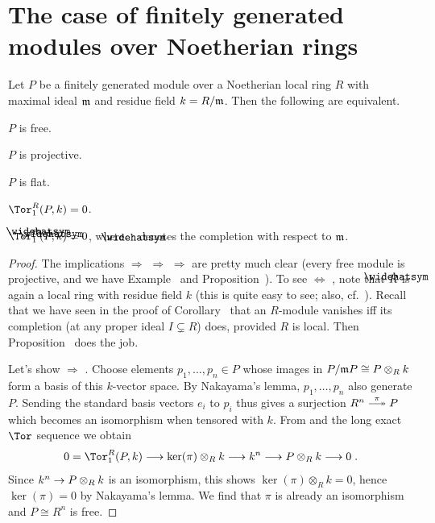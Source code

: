 \documentclass[a4paper,parskip=half,numbers=enddot, DIV=12]{scrreprt}
\begin{document}
\section{The case of finitely generated modules over Noetherian rings}
\begin{prop}
	Let $P$ be a finitely generated module over a Noetherian local ring $R$ with maximal ideal $\mathfrak{m}$ and residue field $k=R/\mathfrak{m}$. Then the following are equivalent.
	\begin{alphanumerate}
		\item $P$ is free.
		\item $P$ is projective.
		\item $P$ is flat.
		\item $\Tor_1^R(P,k)=0$.
		\item $\Tor_1^{\roof{R}}(\roof{P},k)=0$, where $\roof{\phantom{x}}$ denotes the completion with respect to $\mathfrak{m}$.
	\end{alphanumerate}
\end{prop}
\begin{proof}
	The implications  $\Rightarrow$  $\Rightarrow$  $\Rightarrow$  are pretty much clear (every free module is projective, and we have Example~ and Proposition~). To see  $\Leftrightarrow$ , note that $\roof{R}$ is again a local ring with residue field $k$ (this is quite easy to see; also, cf.\ \cite[p.~192]{eisenbudCommAlg}). Recall that we have seen in the proof of Corollary~ that an $R$-module vanishes iff its completion (at any proper ideal $I\subsetneq R$) does, provided $R$ is local. Then Proposition~ does the job.
	
	Let's show  $\Rightarrow$ . Choose elements $p_1,\ldots,p_n\in P$ whose images in $P/\mathfrak{m} P\cong P\otimes_Rk$ form a basis of this $k$-vector space. By Nakayama's lemma, $p_1,\ldots,p_n$ also generate $P$. Sending the standard basis vectors $e_i$ to $p_i$ thus gives a surjection $R^n\epimorphism[\pi]P$ which becomes an isomorphism when tensored with $k$. From  and the long exact $\Tor$ sequence we obtain
	\begin{align*}
		0=\Tor_1^R(P,k)\morphism \ker(\pi)\otimes_Rk\morphism k^n\morphism P\otimes_Rk\morphism 0\;.
	\end{align*} 
	Since $k^n\morphism P\otimes_Rk$ is an isomorphism, this shows $\ker(\pi)\otimes_Rk=0$, hence $\ker(\pi)=0$ by Nakayama's lemma. We find that $\pi$ is already an isomorphism and $P\cong R^n$ is free.
\end{proof}
\end{document}
